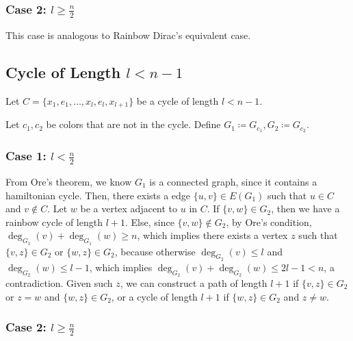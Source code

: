 \subsubsection{Case 2: \( l \geq \frac{n}{2} \)}

This case is analogous to Rainbow Dirac's equivalent case.


\subsection{Cycle of Length $l < n - 1$}

Let \( C = \{x_1, e_1, \dots, x_{l}, e_{l}, x_{l + 1}\} \) be a cycle of length \( l < n - 1 \).

Let \( c_1, c_2 \) be colors that are not in the cycle. Define \(G_1 \coloneqq G_{c_1}, G_2 \coloneqq G_{c_2} \).

\subsubsection{Case 1: \( l < \frac{n}{2} \)}

From Ore's theorem, we know \(G_1\) is a connected graph, since it contains a hamiltonian cycle. 
Then, there exists a edge \( \{u, v\} \in E(G_1) \) such that \( u \in C \) and \( v \not\in C \). 
Let \(w\) be a vertex adjacent to \(u\) in \(C\). 
If \(\{v, w\} \in G_2\), then we have a rainbow cycle of length \( l+1 \). 
Else, since \( \{v, w\} \not\in G_2 \), by Ore's condition, \( \deg_{G_1}(v) + \deg_{G_1}(w) \geq n \),
which implies there exists a vertex \( z \) such that \( \{v, z\} \in G_2 \) or \( \{w, z\} \in G_2 \), because otherwise
\( \deg_{G_2}(v) \leq l \) and \( \deg_{G_2}(w) \leq l - 1 \), which implies 
\( \deg_{G_2}(v) + \deg_{G_2}(w) \leq 2l - 1 < n \), a contradiction.
Given such \(z\), we can construct a path of length \( l+1 \) if \( \{v, z\} \in G_2 \) or 
\( z = w \) and \( \{w, z\} \in G_2 \), or a cycle of length \( l+1 \) if \( \{w, z\} \in G_2 \) and \(z \neq w\).

\subsubsection{Case 2: \( l \geq \frac{n}{2} \)}

